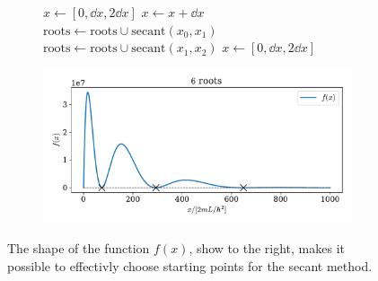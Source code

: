 \documentclass{article}
\begin{document}
    \begin{figure}[ht]
        \centering
        \begin{subfigure}{0.40\textwidth}
            \centering
            \begin{algorithmic}
                \vspace{-1cm}
                \State $x \gets [0, \dd x, 2 \dd x]$
                        \State $x \gets x + \dd{x}$
                    \EndWhile
                    \State $\mathrm{roots} \gets \mathrm{roots} \cup \mathrm{secant}(x_0, x_1)$
                    \State $\mathrm{roots} \gets \mathrm{roots} \cup \mathrm{secant}(x_1, x_2)$
                    \State $x \gets [0, \dd x, 2 \dd x]$
                \EndWhile
            \end{algorithmic}
        \end{subfigure}
        \hfill
        \begin{subfigure}{0.59\textwidth}
            \includegraphics[width=\textwidth]{box_w_barrier/roots.pdf}
        \end{subfigure}
        
        \caption{The shape of the function $f(x)$, show to the right, makes it possible to effectivly choose starting points for the secant method.}
        \label{fig:roots}
    \end{figure}
\end{document}

